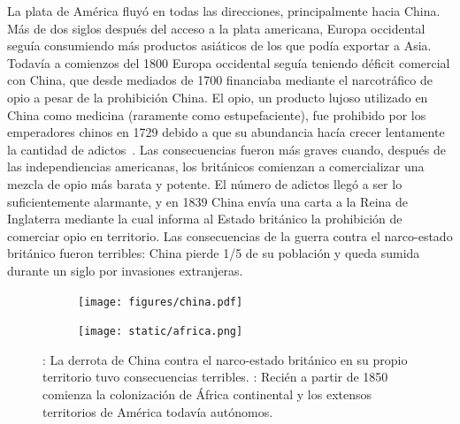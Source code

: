 \documentclass[a4paper,11pt]{book}
\theoremstyle{definition}
\begin{document}
La plata de Am\'erica fluy\'o en todas las direcciones, principalmente hacia China.
M\'as de dos siglos despu\'es del acceso a la plata americana, Europa occidental segu\'ia consumiendo m\'as productos asi\'aticos de los que pod\'ia exportar a Asia.
Todav\'ia a comienzos del 1800 Europa occidental segu\'ia teniendo d\'eficit comercial con China, que desde mediados de 1700 financiaba mediante el narcotr\'afico de opio a pesar de la prohibici\'on China.
%
El opio, un producto lujoso utilizado en China como medicina (raramente como estupefaciente), fue prohibido por los emperadores chinos en 1729 debido a que su abundancia hac\'ia crecer lentamente la cantidad de adictos~\cite{pomeranz2018-tradeCreated}.
%
Las consecuencias fueron m\'as graves cuando, despu\'es de las independiencias americanas, los brit\'anicos comienzan a comercializar una mezcla de opio m\'as barata y potente.
%
El n\'umero de adictos lleg\'o a ser lo suficientemente alarmante, y en 1839 China env\'ia una carta a la Reina de Inglaterra mediante la cual informa al Estado brit\'anico la prohibici\'on de comerciar opio en territorio.
%
Las consecuencias de la guerra contra el narco-estado brit\'anico fueron terribles: China pierde 1/5 de su poblaci\'on y queda sumida durante un siglo por invasiones extranjeras.

\begin{figure}[ht!]
\centering
 \begin{subfigure}[b]{0.45\textwidth} \centering
  \texttt{[image: figures/china.pdf]}
  \caption{}
  \label{fig:china}
  \end{subfigure}
  \begin{subfigure}[b]{0.27\textwidth} \centering
  \texttt{[image: static/africa.png]}
  \caption{}
  \label{fig:africa}
  \end{subfigure}
 \caption{
 : La derrota de China contra el narco-estado brit\'anico en su propio territorio tuvo consecuencias terribles. : Reci\'en a partir de 1850 comienza la colonizaci\'on de \'Africa continental y los extensos territorios de Am\'erica todav\'ia aut\'onomos.
 }
 \label{fig:eraDeGenocidios}
 \end{figure}
\end{document}
